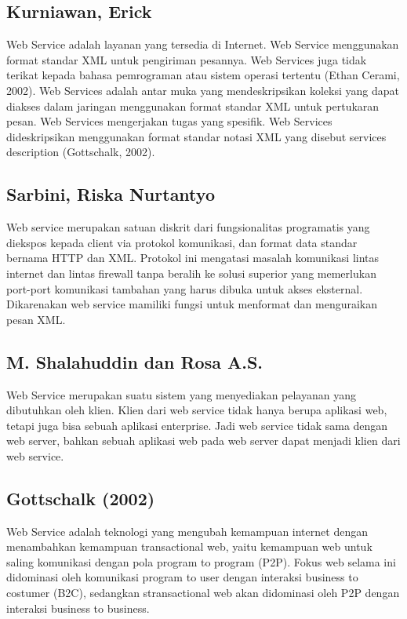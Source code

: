 \subsection{Kurniawan, Erick}

	Web Service adalah layanan yang tersedia di Internet. Web Service menggunakan format standar XML untuk pengiriman pesannya. Web Services juga tidak terikat kepada bahasa pemrograman atau sistem operasi tertentu (Ethan Cerami, 2002). Web Services adalah antar muka yang mendeskripsikan koleksi yang dapat diakses dalam jaringan menggunakan format standar XML untuk pertukaran pesan. Web Services mengerjakan tugas yang spesifik. Web Services dideskripsikan menggunakan format standar notasi XML yang disebut services description (Gottschalk, 2002)\cite{chen2014web}.

\subsection{Sarbini, Riska Nurtantyo}

	Web service merupakan satuan diskrit dari fungsionalitas programatis yang diekspos 
kepada client via protokol komunikasi, dan format data standar bernama HTTP dan 
XML. Protokol ini mengatasi masalah komunikasi lintas internet dan lintas 
firewall tanpa beralih ke solusi superior yang memerlukan port-port komunikasi 
tambahan yang harus dibuka untuk akses eksternal. Dikarenakan web service mamiliki fungsi untuk menformat dan menguraikan pesan XML\cite{sarbini2015pengembangan}. 

\subsection{M. Shalahuddin dan Rosa A.S.}

	Web Service merupakan suatu sistem yang menyediakan pelayanan yang dibutuhkan oleh klien. Klien dari web service tidak hanya berupa aplikasi web, tetapi juga bisa sebuah aplikasi enterprise. Jadi web service tidak sama dengan web server, bahkan sebuah aplikasi web pada web server dapat menjadi klien dari web service\cite{inayah2014aplikasi}.

\subsection{Gottschalk (2002)}

	Web Service adalah teknologi yang mengubah kemampuan internet dengan menambahkan kemampuan transactional web, yaitu kemampuan web untuk saling komunikasi dengan pola program to program (P2P). Fokus web selama ini didominasi oleh komunikasi program to user dengan interaksi business to costumer (B2C), sedangkan stransactional web akan didominasi oleh P2P dengan interaksi business to business\cite{fauziah2014aplikasi}.


